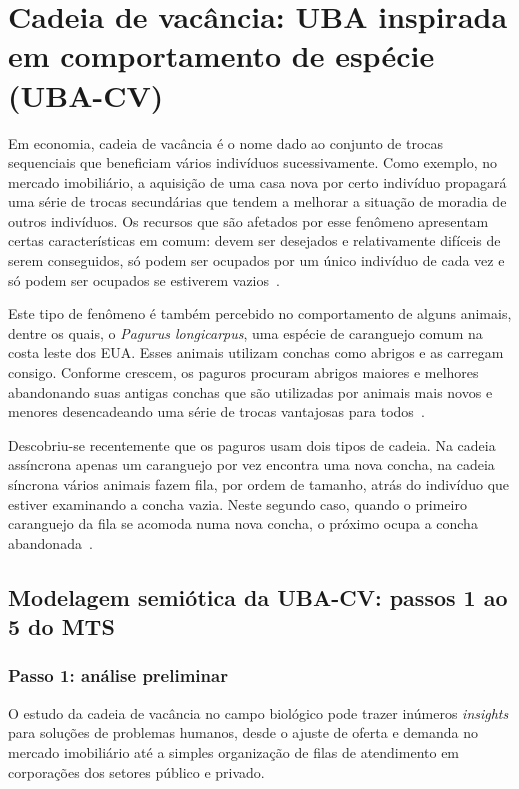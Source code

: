 \chapter{Cadeia de vacância: UBA inspirada em comportamento de espécie (UBA-CV)}

Em economia, cadeia de vacância é o nome dado ao conjunto de trocas sequenciais que beneficiam vários indivíduos sucessivamente. Como exemplo, no mercado imobiliário, a aquisição de uma casa nova por certo indivíduo propagará uma série de trocas secundárias que tendem a melhorar a situação de moradia de outros indivíduos. Os recursos que são afetados por esse fenômeno apresentam certas características em comum: devem ser desejados e relativamente difíceis de serem conseguidos, só podem ser ocupados por um único indivíduo de cada vez e só podem ser ocupados se estiverem vazios~\cite{chase12}.

Este tipo de fenômeno é também percebido no comportamento de alguns animais, dentre os quais, o \textit{Pagurus longicarpus}, uma espécie de caranguejo comum na costa leste dos EUA. Esses animais utilizam conchas como abrigos e as carregam consigo. Conforme crescem, os paguros procuram abrigos maiores e melhores abandonando suas antigas conchas que são utilizadas por animais mais novos e menores desencadeando uma série de trocas vantajosas para todos~\cite{chase12}.

Descobriu-se recentemente que os paguros usam dois tipos de cadeia. Na cadeia assíncrona apenas um caranguejo por vez encontra uma nova concha, na cadeia síncrona vários animais fazem fila, por ordem de tamanho, atrás do indivíduo que estiver examinando a concha vazia. Neste segundo caso, quando o primeiro caranguejo da fila se acomoda numa nova concha, o próximo ocupa a concha abandonada~\cite{chase12}.

\section{Modelagem semiótica da UBA-CV: passos 1 ao 5 do MTS}

\subsection{Passo 1: análise preliminar}

O estudo da cadeia de vacância no campo biológico pode trazer inúmeros \textit{insights} para soluções de problemas humanos, desde o ajuste de oferta e demanda no mercado imobiliário até a simples organização de filas de atendimento em corporações dos setores público e privado.


